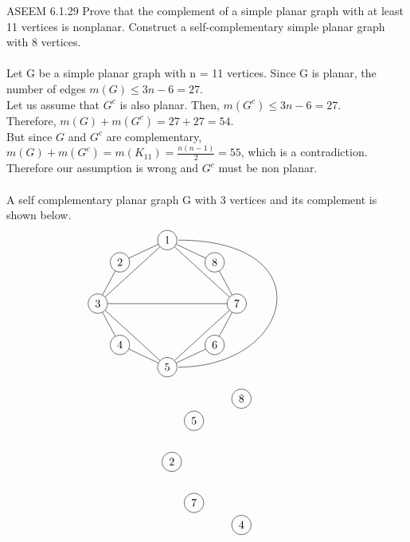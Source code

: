 \documentclass[12pt]{article}
\newenvironment{question}[2][Question]{\begin{trivlist}
\item[\hskip \labelsep {\bfseries #1}\hskip \labelsep {\bfseries #2.}]}{\end{trivlist}}
\begin{document}
\begin{question}{3} \color{blue} ASEEM \color{black}
 6.1.29  Prove that the complement of a simple planar graph with at least 11 vertices is nonplanar.  Construct a self-complementary simple planar graph with 8 vertices. \\
\\ Let G be a simple planar graph with n = 11 vertices. Since G is planar, the number of edges $m(G) \leq 3n - 6 = 27$. \\
Let us assume that $G^{c}$ is also planar. Then, $m(G^{c}) \leq 3n - 6 = 27$. 
\\Therefore, $m(G) + m(G^{c}) = 27 + 27 = 54$.\\
But since $G$ and $G^{c}$ are complementary, $m(G) + m(G^{c}) = m(K_{11}) = \frac{n(n-1)}{2} = 55$, which is a contradiction.
Therefore our assumption is wrong and $G^{c}$ must be non planar. \\
\\ A self complementary planar graph G with 3 vertices and its complement is shown below.
\begin{align*}
\begin{tikzpicture}
\node[shape=circle,draw=black] (1) at (2,1) {1};
\node[shape=circle,draw=black] (2) at (0.5,0.3) {2};
\node[shape=circle,draw=black] (3) at (-0.2,-1) {3};
\node[shape=circle,draw=black] (4) at (0.5,-2.3) {4};
\node[shape=circle,draw=black] (5) at (2,-3) {5};
\node[shape=circle,draw=black] (6) at (3.5,-2.3) {6};
\node[shape=circle,draw=black] (7) at (4.2,-1) {7};
\node[shape=circle,draw=black] (8) at (3.5,0.3) {8};
\path [] (1) edge node[left] {} (2);
\path [] (2) edge node[left] {} (3);
\path [] (3) edge node[left] {} (4);
\path [] (4) edge node[left] {} (5);
\path [] (5) edge node[left] {} (6);
\path [] (6) edge node[left] {} (7);
\path [] (7) edge node[left] {} (8);
\path [] (8) edge node[left] {} (1);
\path [] (1) edge node[left] {} (3);
\path [] (3) edge node[left] {} (5);
\path [] (5) edge node[left] {} (7);
\path [] (7) edge node[left] {} (1);
\path [] (3) edge node[left] {} (7);
\draw (2.35, 1) .. controls (7,1) and (6,-3) .. (2.35, -3);
\end{tikzpicture}
\end{align*}
\begin{align*}
\begin{tikzpicture}
\node[shape=circle,draw=black] (1) at (2,1) {8};
\node[shape=circle,draw=black] (2) at (0.5,0.3) {5};
\node[shape=circle,draw=black] (3) at (-0.2,-1) {2};
\node[shape=circle,draw=black] (4) at (0.5,-2.3) {7};
\node[shape=circle,draw=black] (5) at (2,-3) {4};

\end{tikzpicture}
\end{align*}
\end{question}
\end{document}
